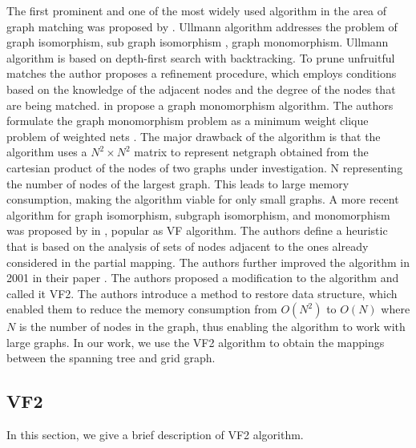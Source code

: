 The first prominent and one of the most widely used algorithm in the area of graph matching was proposed by \citeauthor{Ullmann:1976:ASI:321921.321925} \cite{Ullmann:1976:ASI:321921.321925}. Ullmann algorithm addresses the problem of graph isomorphism, sub graph isomorphism , graph monomorphism. Ullmann algorithm is based on  depth-first search with backtracking. To prune unfruitful matches the author proposes a refinement procedure, which employs conditions based on the knowledge of the adjacent nodes and the degree of the nodes that are being matched. 
\citeauthor{4308468} in \cite{4308468} propose a graph monomorphism algorithm. The authors formulate the graph monomorphism problem as a minimum weight clique problem of weighted nets . The major drawback of the algorithm is that the algorithm uses a $N^2 \times N^2$ matrix to represent netgraph obtained from the cartesian product of the nodes of two graphs under investigation.
N representing the number of nodes of the largest graph. This leads to large memory consumption, making the algorithm viable for only small graphs.
A more recent algorithm for graph isomorphism, subgraph isomorphism, and monomorphism was proposed by \citeauthor{906251} in \cite{906251}, popular as VF algorithm. The authors define a heuristic that is based on the analysis of sets of nodes adjacent to the ones already considered in the partial mapping. The authors further improved the algorithm in 2001 in their paper \cite{cordella2001improved}. 
The authors proposed a modification to the algorithm and called it VF2. The authors introduce a method to restore data structure, which enabled them to reduce the memory consumption from $O(N^2)$ to $O(N)$ where $N$ is the number of nodes in the graph, thus enabling the algorithm to work with large graphs.
In our work, we use the VF2 algorithm to obtain the mappings between the spanning tree and grid graph.

\subsection{VF2}

In this section, we give a brief description of VF2 algorithm.\\

